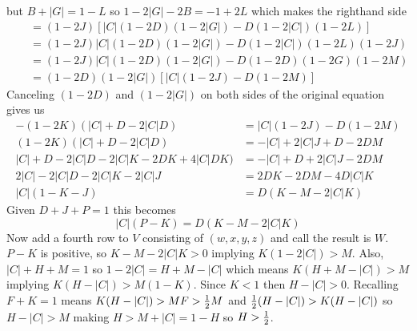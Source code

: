 but $B+|G|=1-L$ so $1-2|G|-2B = -1+2L$ which makes the righthand side
\begin{align*}
~~~~&= (1-2J)[|C|(1-2D)(1-2|G|)-D(1-2|C|)(1-2L)]     \\
~~~~&= (1-2J)|C|(1-2D)(1-2|G|)-D(1-2|C|)(1-2L)(1-2J) \\
~~~~&= (1-2J)|C|(1-2D)(1-2|G|)-D(1-2D)(1-2G)(1-2M)   \\
~~~~&= (1-2D)(1-2|G|)[|C|(1-2J)-D(1-2M)]
\end{align*}
Canceling $(1-2D)$ and $(1-2|G|)$ on both sides of the original equation gives
us
\begin{align*}
            -(1-2K)(|C|+D-2|C|D) &= |C|(1-2J)-D(1-2M) \\
             (1-2K)(|C|+D-2|C|D) &= -|C|+2|C|J+D-2DM  \\
   |C|+D-2|C|D-2|C|K-2DK+4|C|DK) &= -|C|+D+2|C|J-2DM  \\
          2|C|-2|C|D-2|C|K-2|C|J &= 2DK-2DM-4D|C|K    \\
                      |C|(1-K-J) &= D(K-M-2|C|K)
\end{align*}
Given $D+J+P=1$ this becomes
\begin{equation*}
|C|(P-K) = D(K-M-2|C|K)
\end{equation*}
Now add a fourth row to $V$ consisting of $(w,x,y,z)$ and call the result is
$W$.  $P-K$ is positive, so $K-M-2|C|K > 0$ implying $K(1-2|C|) > M$.  Also,
$|C|+H+M=1$ so $1-2|C| = H+M-|C|$ which means $K(H+M-|C|) > M$ implying
$K(H-|C|) > M(1-K)$.  Since $K<1$ then $H-|C|>0$.  Recalling $F+K=1$ means
$K(H-|C|) > MF > \frac{1}{2} M$ and $\frac{1}{2}(H-|C|) > K(H-|C|)$ so
$H-|C| > M$ making $H > M+|C| = 1-H$ so $H > \frac{1}{2}$.

